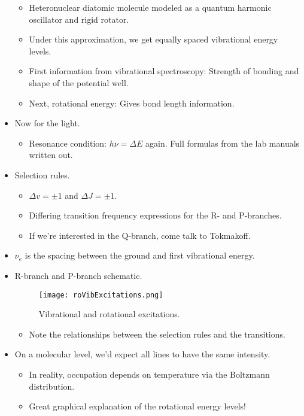 \documentclass[../notes.tex]{subfiles}
\begin{document}
\begin{itemize}
    \begin{itemize}
        \item Heteronuclear diatomic molecule modeled as a quantum harmonic oscillator and rigid rotator.
        \item Under this approximation, we get equally spaced vibrational energy levels.
        \item First information from vibrational spectroscopy: Strength of bonding and shape of the potential well.
        \item Next, rotational energy: Gives bond length information.
    \end{itemize}
    \item Now for the light.
    \begin{itemize}
        \item Resonance condition: $h\nu=\Delta E$ again. Full formulas from the lab manuals written out.
    \end{itemize}
    \item Selection rules.
    \begin{itemize}
        \item $\Delta v=\pm 1$ and $\Delta J=\pm 1$.
        \item Differing transition frequency expressions for the R- and P-branches.
        \item If we're interested in the Q-branch, come talk to Tokmakoff.
    \end{itemize}
    \item $\nu_e$ is the spacing between the ground and first vibrational energy.
    \item R-branch and P-branch schematic.
    \begin{figure}[h!]
        \centering
        \texttt{[image: roVibExcitations.png]}
        \caption{Vibrational and rotational excitations.}
        \label{fig:roVibExcitations}
    \end{figure}
    \begin{itemize}
        \item Note the relationships between the selection rules and the transitions.
    \end{itemize}
    \item On a molecular level, we'd expect all lines to have the same intensity.
    \begin{itemize}
        \item In reality, occupation depends on temperature via the Boltzmann distribution.
        \item Great graphical explanation of the rotational energy levels!

\end{itemize}
\end{itemize}
\end{document}
